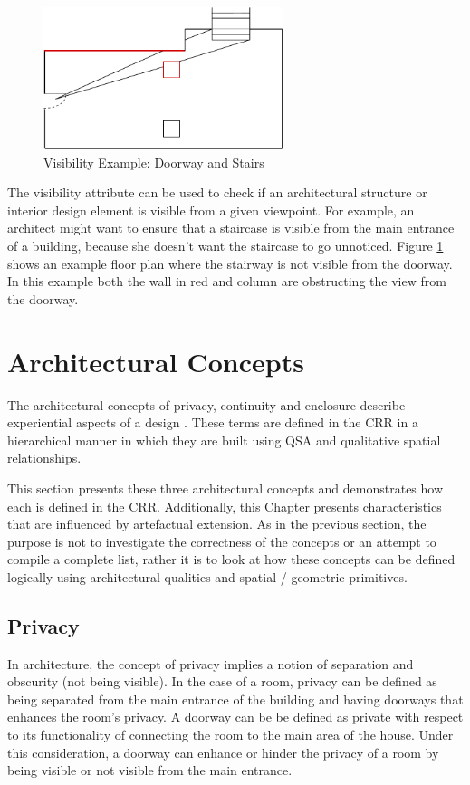 \documentclass[12pt]{ucthesis}
\begin{document}
\begin{figure}[h]
\centering
\includegraphics[width=70mm]{visibility-stair-door}
\caption{Visibility Example: Doorway and Stairs}
\label{visibility-door-stair}
\end{figure}

The visibility attribute can be used to check if an architectural structure or interior design element is visible from a given viewpoint. For example, an architect might want to ensure that a staircase is visible from the main entrance of a building, because she doesn't want the staircase to go unnoticed. Figure \ref{visibility-door-stair} shows an example floor plan where the stairway is not visible from the doorway. In this example both the wall in red and column are obstructing the view from the doorway. 




\section{Architectural Concepts}
The architectural concepts of privacy, continuity and enclosure describe experiential aspects of a design \cite{KoileTAC}. These terms are defined in the CRR in a hierarchical manner in which they are built using QSA and qualitative spatial relationships. 

This section presents these three architectural concepts and demonstrates how each is defined in the CRR. Additionally, this Chapter presents characteristics that are influenced by artefactual extension. As in the previous section, the purpose is not to investigate the correctness of the concepts or an attempt to compile a complete list, rather it is to look at how these concepts can be defined logically using architectural qualities and spatial / geometric primitives.

\subsection{Privacy}
In architecture, the concept of privacy implies a notion of separation and obscurity (not being visible). In the case of a room, privacy can be defined as being separated from the main entrance of the building and having doorways that enhances the room's privacy. A doorway can be be defined as private with respect to its functionality of connecting the room to the main area of the house. Under this consideration, a doorway can enhance or hinder the privacy of a room by being visible or not visible from the main entrance.
\end{document}

